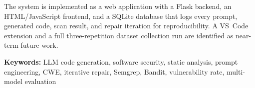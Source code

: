 \documentclass[12pt,a4paper]{report}
\begin{document}
\vspace{0.15in}
\noindent The system is implemented as a web application with a Flask backend,
an HTML/JavaScript frontend, and a SQLite database that logs every prompt,
generated code, scan result, and repair iteration for reproducibility. A VS~Code
extension and a full three-repetition dataset collection run are identified as
near-term future work.

\vspace{0.18in}
\noindent\textbf{Keywords:} LLM code generation, software security, static analysis,
prompt engineering, CWE, iterative repair, Semgrep, Bandit, vulnerability rate,
multi-model evaluation

\newpage
\tableofcontents

\newpage
\listoffigures

\newpage
\listoftables
\end{document}
